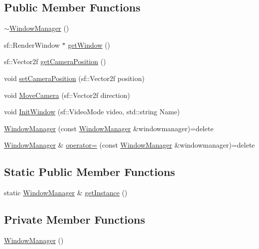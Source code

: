 \subsection*{Public Member Functions}
\begin{DoxyCompactItemize}
\item 
\hyperlink{class_window_manager_a19fd6e41c42760af82460d9851780d82}{$\sim$\-Window\-Manager} ()
\item 
sf\-::\-Render\-Window $\ast$ \hyperlink{class_window_manager_a7051ab4ec34157357d2fc029b5283ba0}{get\-Window} ()
\item 
sf\-::\-Vector2f \hyperlink{class_window_manager_a6c6ca24d553fcbc205ca6eba14eea324}{get\-Camera\-Position} ()
\item 
void \hyperlink{class_window_manager_a5ee838ab6472ae7fcfd607831a8228d1}{set\-Camera\-Position} (sf\-::\-Vector2f position)
\item 
void \hyperlink{class_window_manager_abbc66e888f2a67ab0203357005bc89d8}{Move\-Camera} (sf\-::\-Vector2f direction)
\item 
void \hyperlink{class_window_manager_af570f14ac975aa3073a51238f5121d79}{Init\-Window} (sf\-::\-Video\-Mode video, std\-::string Name)
\item 
\hyperlink{class_window_manager_aff6aee52b2c1ab9fe85027262b4b877f}{Window\-Manager} (const \hyperlink{class_window_manager}{Window\-Manager} \&windowmanager)=delete
\item 
\hyperlink{class_window_manager}{Window\-Manager} \& \hyperlink{class_window_manager_a11afbf3f6296341434679bbedb44c989}{operator=} (const \hyperlink{class_window_manager}{Window\-Manager} \&windowmanager)=delete
\end{DoxyCompactItemize}
\subsection*{Static Public Member Functions}
\begin{DoxyCompactItemize}
\item 
static \hyperlink{class_window_manager}{Window\-Manager} \& \hyperlink{class_window_manager_a4f5e8cf13cbe4f2d80f3dbcf7f3fb2eb}{get\-Instance} ()
\end{DoxyCompactItemize}
\subsection*{Private Member Functions}
\begin{DoxyCompactItemize}
\item 
\hyperlink{class_window_manager_a3a283b34c19aaa20296befaabad4d29b}{Window\-Manager} ()
\end{DoxyCompactItemize}

